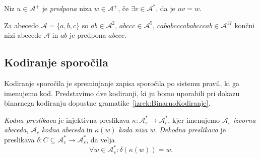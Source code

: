 \documentclass[fin1, tisk]{fmfdelo}
\newcommand{\A}{\mathcal{A}}
\theoremstyle{definition}
\begin{document}
\begin{definicija}
    Niz $u \in \A^+$ je \emph{predpona} niza $w \in \A^+$, če $\exists v \in \A^*$, da je
    $uv = w$.
\end{definicija}

\begin{primer}\label{primer:string}
    Za abecedo $\A = \{ a,b,c \}$ so $\mathit{ab} \in \A^2$, $\mathit{abccc} \in \A^5$,
    $\mathit{cababcccababcccab} \in \A^{17}$ končni nizi abecede $\A$ in $\mathit{ab}$ je
    predpona $\mathit{abccc}$.
\end{primer}

\subsection{Kodiranje sporočila}

Kodiranje sporočila je spreminjanje zapisa sporočila po sistemu pravil, ki ga imenujemo kod.
Predstavimo dve kodiranji, ki ju bomo uporabili pri dokazu binarnega kodiranju dopustne
gramatike~\ref{izrek:BinarnoKodiranje}.

\begin{definicija}
    \emph{Kodna preslikava} je injektivna preslikava $ \kappa \colon \A^*_s
    \to \A_c^* $, kjer imenujemo $\A_s$ \emph{izvorna abeceda}, $\A_c$ 
    \emph{kodna abeceda} in $\kappa(w)$ \emph{koda niza $w$}. 
    \emph{Dekodna preslikava} je preslikava $ \delta \colon C \subseteq \A^*_c 
    \to \A_s^* $, da velja
    \[
        \forall w \in \A_s^* \colon \delta(\kappa(w)) = w.
    \]
\end{definicija}
\end{document}
